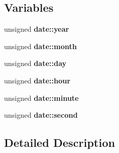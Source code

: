 \subsection*{Variables}
\begin{DoxyCompactItemize}
\item 
\mbox{\label{group__RTC_ga7eeca50fa6ddacac20476f1db5f0cb15}} 
unsigned {\bfseries date\+::year}
\item 
\mbox{\label{group__RTC_gaa3b7b0b8825fd09a4d5ba9d3361674c2}} 
unsigned {\bfseries date\+::month}
\item 
\mbox{\label{group__RTC_ga00e866e3d9ad7beba371be78cf1d509a}} 
unsigned {\bfseries date\+::day}
\item 
\mbox{\label{group__RTC_gafc4f592b2f1d33a22bd3963f10a2e15a}} 
unsigned {\bfseries date\+::hour}
\item 
\mbox{\label{group__RTC_gaac77d900f8d7d0c80849c44f8626bc94}} 
unsigned {\bfseries date\+::minute}
\item 
\mbox{\label{group__RTC_ga2a3229dea0a9f0322963d229b6575056}} 
unsigned {\bfseries date\+::second}
\end{DoxyCompactItemize}


\subsection{Detailed Description}

